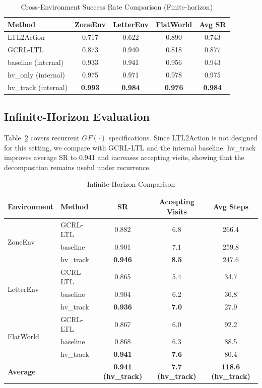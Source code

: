 \documentclass[conference]{IEEEtran}
\begin{document}
\begin{table}[t]
\centering
\caption{Cross-Environment Success Rate Comparison (Finite-horizon)}
\label{tab:cross_env}
\begin{tabular}{@{}lcccc@{}}
\toprule
\textbf{Method} & \textbf{ZoneEnv} & \textbf{LetterEnv} & \textbf{FlatWorld} & \textbf{Avg SR} \\ \midrule
LTL2Action & 0.717 & 0.622 & 0.890 & 0.743 \\
GCRL-LTL & 0.873 & 0.940 & 0.818 & 0.877 \\
baseline (internal) & 0.933 & 0.941 & 0.956 & 0.943 \\
hv\_only (internal) & 0.975 & 0.971 & 0.978 & 0.975 \\
hv\_track (internal) & \textbf{0.993} & \textbf{0.984} & \textbf{0.976} & \textbf{0.984} \\ \bottomrule
\end{tabular}
\end{table}

\subsection{Infinite-Horizon Evaluation}

Table~\ref{tab:infinite_horizon} covers recurrent $GF(\cdot)$ specifications. Since LTL2Action is not designed for this setting, we compare with GCRL-LTL and the internal baseline. hv\_track improves average SR to 0.941 and increases accepting visits, showing that the decomposition remains useful under recurrence.

\begin{table}[t]
\centering
\caption{Infinite-Horizon Comparison}
\label{tab:infinite_horizon}
\begin{tabular}{@{}llccc@{}}
\toprule
\textbf{Environment} & \textbf{Method} & \textbf{SR} & \textbf{Accepting Visits} & \textbf{Avg Steps} \\ \midrule
\multirow{3}{*}{ZoneEnv} 
& GCRL-LTL & 0.882 & 6.8 & 266.4 \\
& baseline & 0.901 & 7.1 & 259.8 \\
& hv\_track & \textbf{0.946} & \textbf{8.5} & 247.6 \\ \midrule
\multirow{3}{*}{LetterEnv} 
& GCRL-LTL & 0.865 & 5.4 & 34.7 \\
& baseline & 0.904 & 6.2 & 30.8 \\
& hv\_track & \textbf{0.936} & \textbf{7.0} & 27.9 \\ \midrule
\multirow{3}{*}{FlatWorld} 
& GCRL-LTL & 0.867 & 6.0 & 92.2 \\
& baseline & 0.868 & 6.3 & 88.5 \\
& hv\_track & \textbf{0.941} & \textbf{7.6} & 80.4 \\ \midrule
\multicolumn{2}{l}{\textbf{Average}} & \textbf{0.941 (hv\_track)} & \textbf{7.7 (hv\_track)} & \textbf{118.6 (hv\_track)} \\ \bottomrule
\end{tabular}
\end{table}
\end{document}
